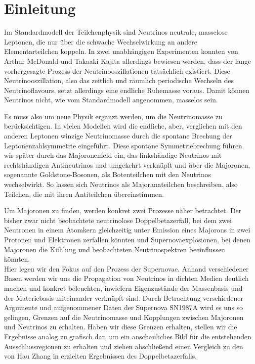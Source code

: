 \chapter{Einleitung}
\label{chap:einleitung}

Im Standardmodell der Teilchenphysik sind Neutrinos neutrale, masselose Leptonen, die nur über die schwache Wechselwirkung an andere Elementarteilchen koppeln.
In zwei unabhängigen Experimenten konnten von Arthur McDonald und Takaaki Kajita allerdings bewiesen werden, dass der lange vorhergesagte Prozess der Neutrinooszillationen tatsächlich existiert.
Diese Neutrinooszillation, also das zeitlich und räumlich periodische Wechseln des Neutrinoflavours, setzt allerdings eine endliche Ruhemasse voraus.
Damit können Neutrinos nicht, wie vom Standardmodell angenommen, masselos sein.

Es muss also um neue Physik ergänzt werden, um die Neutrinomasse zu berücksichtigen.
In vielen Modellen wird die endliche, aber, verglichen mit den anderen Leptonen winzige Neutrinomasse durch die spontane Brechung der Leptonenzahlsymmetrie eingeführt.
Diese spontane Symmetriebrechung führen wir später durch das Majoronenfeld ein, das linkshändige Neutrinos mit rechtshändigen Antineutrinos und umgekehrt verknüpft und über die Majoronen, sogenannte Goldstone-Bosonen, als Botenteilchen
mit den Neutrinos wechselwirkt.
So lassen sich Neutrinos als Majoranateilchen beschreiben, also Teilchen, die mit ihren Antiteilchen übereinstimmen.

Um Majoronen zu finden, werden konkret zwei Prozesse näher betrachtet.
Der bisher zwar nicht beobachtete neutrinolose Doppelbetazerfall, bei dem zwei Neutronen in einem Atomkern gleichzeitig unter Emission eines Majorons in zwei Protonen und Elektronen zerfallen könnten und Supernovaexplosionen, bei denen
Majoronen die Kühlung und beobachteten Neutrinospektren beeinflussen könnten. \\
Hier legen wir den Fokus auf den Prozess der Supernovae.
Anhand verschiedener Basen werden wir uns die Propagation von Neutrinos in dichten Medien deutlich machen und konkret beleuchten, 
inwiefern Eigenzustände der Massenbasis und der Materiebasis miteinander verknüpft sind.
Durch Betrachtung verschiedener Argumente und aufgenommener Daten der Supernova SN1987A wird es uns so gelingen, Grenzen auf die Neutrinomasse und Kopplungen zwischen Majoronen und Neutrinos zu erhalten.
Haben wir diese Grenzen erhalten, stellen wir die Ergebnisse analog zu \cite{päspaper} grafisch dar, um ein anschauliches Bild für die entstehenden Ausschlussregionen zu erhalten und ziehen abschließend einen Vergleich
zu den von Hau Zhang in \cite{hauhau} erzielten Ergebnissen des Doppelbetazerfalls.


